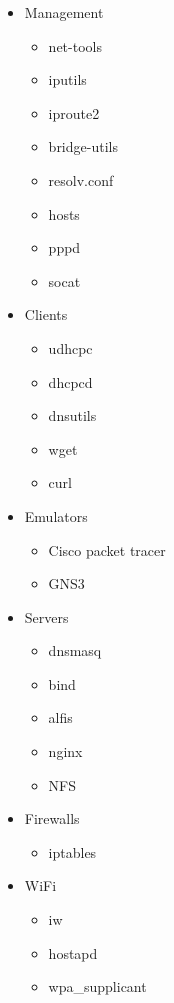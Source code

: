 \begin{itemize}
        \item Management
        \begin{itemize}
            \item net-tools
            \item iputils
            \item iproute2
            \item bridge-utils
            \item resolv.conf
            \item hosts
            \item pppd
            \item socat
        \end{itemize}

        \item Clients
        \begin{itemize}
            \item udhcpc
            \item dhcpcd
            \item dnsutils
            \item wget
            \item curl
        \end{itemize}

        \item Emulators
        \begin{itemize}
            \item Cisco packet tracer
            \item GNS3
        \end{itemize}

        \item Servers
        \begin{itemize}
            \item dnsmasq
            \item bind
            \item alfis
            \item nginx
            \item NFS
        \end{itemize}

        \item Firewalls
        \begin{itemize}
            \item iptables
        \end{itemize}

        \item WiFi
        \begin{itemize}
            \item iw
            \item hostapd
            \item wpa\_supplicant
        \end{itemize}


\end{itemize}
